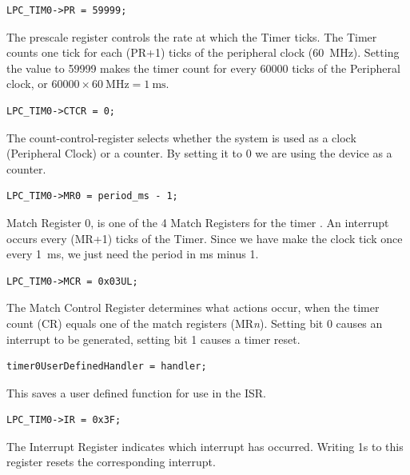 \documentclass[a4paper]{tufte-handout}
\begin{document}
\begin{verbatim}
LPC_TIM0->PR = 59999;
\end{verbatim}
The prescale register \citep[24.6.4]{lpc4088} controls the rate at
which the Timer ticks.  The Timer counts one tick for each (PR+1)
ticks of the peripheral clock (\SI{60}{\mega\hertz}).  Setting the
value to 59999 makes the timer count for every 60000 ticks of the
Peripheral clock, or $60000\times\SI{60}{\mega\hertz} =
\SI{1}{\milli\second}$. 

\begin{verbatim}
LPC_TIM0->CTCR = 0;
\end{verbatim}
The count-control-register \citep[24.6.11]{lpc4088} selects whether the
system is used as a clock (Peripheral Clock) or a counter.  By setting
it to 0 we are using the device as a counter.

\begin{verbatim}
LPC_TIM0->MR0 = period_ms - 1;
\end{verbatim}
Match Register 0, is one of the 4 Match Registers for the timer
\citep[24.6.7]{lpc4088}.  An interrupt occurs every (MR+1) ticks of
the Timer.  Since we have make the clock tick once every
\SI{1}{\milli\second}, we just need the period in \si{\milli\second}
minus 1.

\begin{verbatim}
LPC_TIM0->MCR = 0x03UL;
\end{verbatim}
The Match Control Register \citep[24.6.6]{lpc4088} determines what
actions occur, when the timer count (CR) equals one of the match
registers (MR\textit{n}).  Setting bit 0 causes an interrupt to be
generated, setting bit 1 causes a timer reset.

\begin{verbatim}
timer0UserDefinedHandler = handler;
\end{verbatim}
This saves a user defined function for use in the ISR.

\begin{verbatim}
LPC_TIM0->IR = 0x3F;
\end{verbatim}
The Interrupt Register \citep[24.6.1]{lpc4088} indicates which
interrupt has occurred.  Writing 1s to this register resets the
corresponding interrupt.
\end{document}

